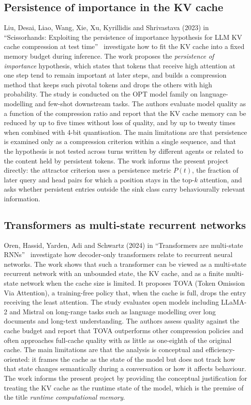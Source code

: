 \subsection{Persistence of importance in the KV cache}\label{lit:scissor}
Liu, Desai, Liao, Wang, Xie, Xu, Kyrillidis and Shrivastava (2023) in ``Scissorhands: Exploiting the persistence of importance hypothesis for LLM KV cache compression at test time''~\cite{liu2023scissorhands} investigate how to fit the KV cache into a fixed memory budget during inference. The work proposes the \emph{persistence of importance} hypothesis, which states that tokens that receive high attention at one step tend to remain important at later steps, and builds a compression method that keeps such pivotal tokens and drops the others with high probability. The study is conducted on the OPT model family on language-modelling and few-shot downstream tasks. The authors evaluate model quality as a function of the compression ratio and report that the KV cache memory can be reduced by up to five times without loss of quality, and by up to twenty times when combined with 4-bit quantisation. The main limitations are that persistence is examined only as a compression criterion within a single sequence, and that the hypothesis is not tested across turns written by different agents or related to the content held by persistent tokens. The work informs the present project directly: the attractor criterion uses a persistence metric $P(t)$, the fraction of later query and head pairs for which a position stays in the top-$k$ attention, and asks whether persistent entries outside the sink class carry behaviourally relevant information.

\subsection{Transformers as multi-state recurrent networks}\label{lit:tova}
Oren, Hassid, Yarden, Adi and Schwartz (2024) in ``Transformers are multi-state RNNs''~\cite{oren2024msrnn} investigate how decoder-only transformers relate to recurrent neural networks. The work shows that such a transformer can be viewed as a multi-state recurrent network with an unbounded state, the KV cache, and as a finite multi-state network when the cache size is limited. It proposes TOVA (Token Omission Via Attention), a training-free policy that, when the cache is full, drops the entry receiving the least attention. The study evaluates open models including LLaMA-2 and Mistral on long-range tasks such as language modelling over long documents and long-text understanding. The authors assess quality against the cache budget and report that TOVA outperforms other compression policies and often approaches full-cache quality with as little as one-eighth of the original cache. The main limitations are that the analysis is conceptual and efficiency-oriented: it frames the cache as the state of the model but does not track how that state changes semantically during a conversation or how it affects behaviour. The work informs the present project by providing the conceptual justification for treating the KV cache as the runtime state of the model, which is the premise of the title \emph{runtime computational memory}.

